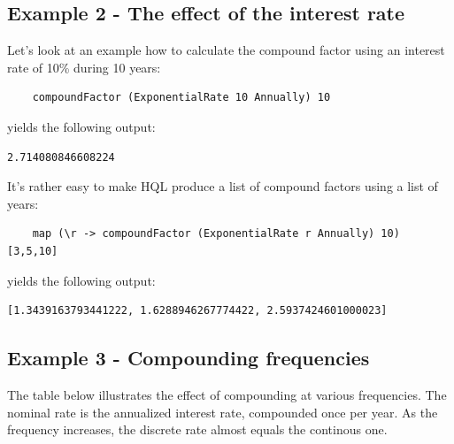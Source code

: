 \documentclass[11pt,a4paper]{article}
\numberwithin{equation}{section}
\begin{document}
	\subsection{Example 2 - The effect of the interest rate}

	Let's look at an example how to calculate the compound factor using an interest rate of 10\% during 10 years:

	\FrameSep
	\begin{lstlisting}
	compoundFactor (ExponentialRate 10 Annually) 10	
	\end{lstlisting}
	\FrameSep

	yields the following output:
	\FrameSep
	\begin{lstlisting}[style=Output]
	2.714080846608224
	\end{lstlisting}

	It's rather easy to make HQL produce a list of compound factors using a list of years:

	\FrameSep
	\begin{lstlisting}
	map (\r -> compoundFactor (ExponentialRate r Annually) 10) [3,5,10]
	\end{lstlisting}
	\FrameSep

	yields the following output:
	\FrameSep
	\begin{lstlisting}[style=Output]
	[1.3439163793441222, 1.6288946267774422, 2.5937424601000023]
	\end{lstlisting}

	\subsection{Example 3 - Compounding frequencies}

	The table below illustrates the effect of compounding at various frequencies. The nominal rate
	is the annualized interest rate, compounded once per year. As the frequency increases, the discrete
	rate almost equals the continous one.
\end{document}

